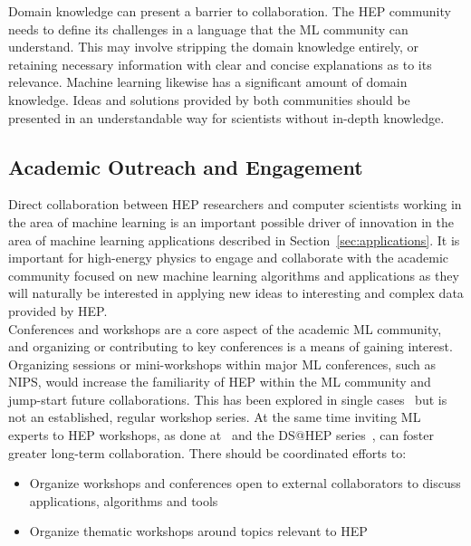 Domain knowledge can present a barrier to collaboration. The HEP community needs to define its challenges in a language that the ML community can understand. This may involve stripping the domain knowledge entirely, or retaining necessary information with clear and concise explanations as to its relevance. Machine learning likewise has a significant amount of domain knowledge. Ideas and solutions provided by both communities should be presented in an understandable way for scientists without in-depth knowledge.

\subsection{Academic Outreach and Engagement}

Direct collaboration between HEP researchers and computer scientists working in the area of machine learning is an important possible driver of innovation in the area of machine learning applications described in Section~\ref{sec:applications}.
It is important for high-energy physics to engage and collaborate with the academic community focused on new machine learning algorithms and applications as they will naturally be interested in applying new ideas to interesting and complex data provided by HEP.\\

Conferences and workshops are a core aspect of the academic ML community, and organizing or contributing to key conferences is a means of gaining interest.
Organizing sessions or mini-workshops within major ML conferences, such as NIPS, would increase the familiarity of HEP within the ML community and jump-start future collaborations.
This has been explored in single cases~\cite{NIPS:2015:ALEPH} but is not an established, regular workshop series.
At the same time inviting ML experts to HEP workshops, as done at~\cite{FlavourDataMining} and the DS@HEP series~\cite{DSatHEP2015, DSatHEP2016, DSatHEP2017}, can foster greater long-term collaboration.
There should be coordinated efforts to:
\begin{itemize}
 \item Organize workshops and conferences open to external collaborators to discuss applications, algorithms and tools
 \item Organize thematic workshops around topics relevant to HEP
\end{itemize}

